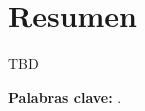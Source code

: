 %
%
%
% 
%
%
%
%

\chapter*{Resumen}
\label{cha:resumen}


TBD

\textbf{Palabras clave:} \myThesisKeywords.




